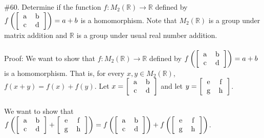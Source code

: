 \documentclass[11pt]{amsart}
\begin{document}
\#60. Determine if the function $f:M_2(\mathbb{R}) \to \mathbb{R}$ defined by $f\left({\left[{ \begin{tabular}{c c}  a & b\\ c & d\end{tabular}}\right]}\right) = a+b$ is a homomorphism. Note that $M_2(\mathbb{R})$ is a group under matrix addition and $\mathbb{R}$ is a group under usual real number addition.\\
\\Proof: We want to show that $f:M_2(\mathbb{R}) \to \mathbb{R}$ defined by $f\left({\left[{ \begin{tabular}{c c}  a & b\\ c & d\end{tabular}}\right]}\right) = a+b$ is a homomorphism. That is, for every $x,y\in M_2(\mathbb{R})$, $f(x+y)=f(x)+f(y)$. Let $x={\left[{ \begin{tabular}{c c}  a & b\\ c & d\end{tabular}}\right]}$ and let $y={\left[{ \begin{tabular}{c c}  e & f\\ g & h\end{tabular}}\right]}$. \\
\\We want to show that $f\left({\left[{ \begin{tabular}{c c}  a & b\\ c & d\end{tabular}}\right]}+{\left[{ \begin{tabular}{c c}  e & f\\ g & h\end{tabular}}\right]}\right)=f\left({\left[{ \begin{tabular}{c c}  a & b\\ c & d\end{tabular}}\right]}\right)+f\left({\left[{ \begin{tabular}{c c}  e & f\\ g & h\end{tabular}}\right]}\right)$. \\
\end{document}
